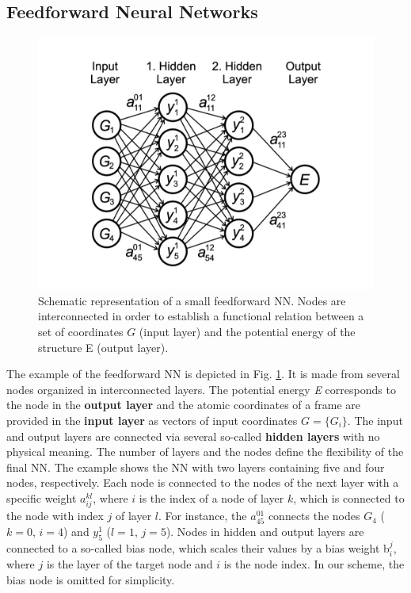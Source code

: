 \documentclass[12pt]{article}
\begin{document}
\subsection{Feedforward Neural Networks}
\begin{figure}[!h]
    \centering
    \includegraphics[scale=0.4]{NNP_scheme.jpeg}
    \caption{Schematic representation of a small feedforward NN. Nodes are interconnected in order to establish a functional relation between a set of coordinates $G$ (input layer) and the potential energy of the structure E (output layer). }
    \label{NNP_scheme}
\end{figure}
The example of the feedforward NN is depicted in Fig. \ref{NNP_scheme}. It is made from several nodes organized in interconnected layers. The potential energy \textit{E} corresponds to the node in the \textbf{output layer} and the atomic coordinates of a frame are provided in the \textbf{input layer} as vectors of input coordinates $G=\{G_i\}$. The input and output layers are connected via several so-called \textbf{hidden layers} with no physical meaning. The number of layers and the nodes define the flexibility of the final NN. The example shows the NN with two layers containing five and four nodes, respectively. 
Each node is connected to the nodes of the next layer with a specific weight \textbf{$a_{ij}^{kl}$}, where $i$ is the index of a node of layer $k$, which is connected to the node with index $j$ of layer $l$. For instance, the $a_{45}^{01}$ connects the nodes $G_4$ ($k = 0$, $i=4$) and $y_5^1$ ($l=1$,  $j=5$). Nodes in hidden and output layers are connected to a so-called bias node, which scales their values by a bias weight b$_i^j$, where $j$ is the layer of the target node and $i$ is the node index. In our scheme, the bias node is omitted for simplicity.
\end{document}
